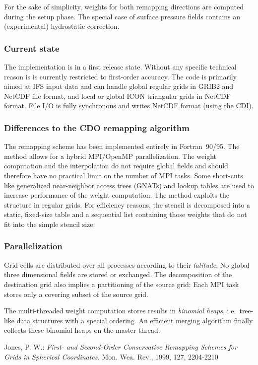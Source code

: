 \documentclass[a4paper,10pt, DIV14]{scrartcl}
\begin{document}
For the sake of simplicity, weights for both remapping directions are
computed during the setup phase.
The special case of surface pressure fields contains an (experimental) hydrostatic correction.


\subsubsection*{Current state}

The implementation is in a first release state.
Without any specific technical reason is is currently restricted to first-order accuracy.
The code is primarily aimed at IFS input data and can handle global regular grids in
GRIB2 and NetCDF file format, and local or global ICON triangular grids in NetCDF format.
File I/O is fully synchronous and writes NetCDF format (using the CDI).


\subsubsection*{Differences to the CDO remapping algorithm}

The remapping scheme has been implemented entirely in Fortran~90/95.
The method allows for a hybrid MPI/OpenMP parallelization.
The weight computation and the interpolation do not require global fields
and should therefore have no practical limit on the number of MPI tasks.
Some short-cuts like generalized near-neighbor access trees (GNATs) and
lookup tables are used to increase performance of the weight computation.
The method exploits the structure in regular grids.
For efficiency reasons, the stencil is decomposed into a static, fixed-size
table and a sequential list containing those weights that do not fit into
the simple stencil size.


\subsubsection*{Parallelization}

Grid cells are distributed over all processes according to their \emph{latitude}.
No global three dimensional fields are stored or exchanged.
The decomposition of the destination grid also implies a partitioning of the
source grid:
Each MPI task stores only a covering subset  of the source grid.

The multi-threaded weight computation stores results in \emph{binomial heaps}, i.e.\ tree-like
data structures with a special ordering.
An efficient merging algorithm finally collects these binomial heaps on the master thread.


 
\begin{thebibliography}{1}
   Jones, P. W.: 
                      \emph{First- and Second-Order Conservative Remapping Schemes for Grids in Spherical Coordinates.}
                      Mon. Wea. Rev., 1999, 127, 2204-2210
\end{thebibliography}
\end{document}
